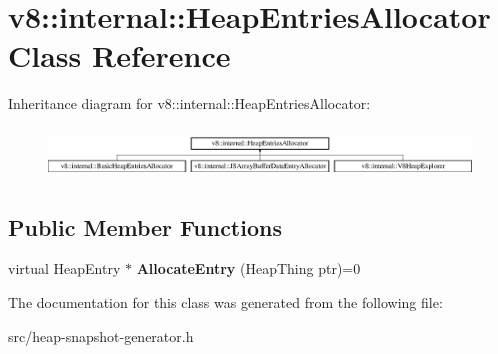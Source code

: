 \hypertarget{classv8_1_1internal_1_1_heap_entries_allocator}{}\section{v8\+:\+:internal\+:\+:Heap\+Entries\+Allocator Class Reference}
\label{classv8_1_1internal_1_1_heap_entries_allocator}
Inheritance diagram for v8\+:\+:internal\+:\+:Heap\+Entries\+Allocator\+:\begin{figure}[H]
\begin{center}
\leavevmode
\includegraphics[height=1.342926cm]{classv8_1_1internal_1_1_heap_entries_allocator}
\end{center}
\end{figure}
\subsection*{Public Member Functions}
\begin{DoxyCompactItemize}
\item 
\hypertarget{classv8_1_1internal_1_1_heap_entries_allocator_a50db4f7564a26290843caffad619edbb}{}virtual Heap\+Entry $\ast$ {\bfseries Allocate\+Entry} (Heap\+Thing ptr)=0\label{classv8_1_1internal_1_1_heap_entries_allocator_a50db4f7564a26290843caffad619edbb}

\end{DoxyCompactItemize}


The documentation for this class was generated from the following file\+:\begin{DoxyCompactItemize}
\item 
src/heap-\/snapshot-\/generator.\+h\end{DoxyCompactItemize}
